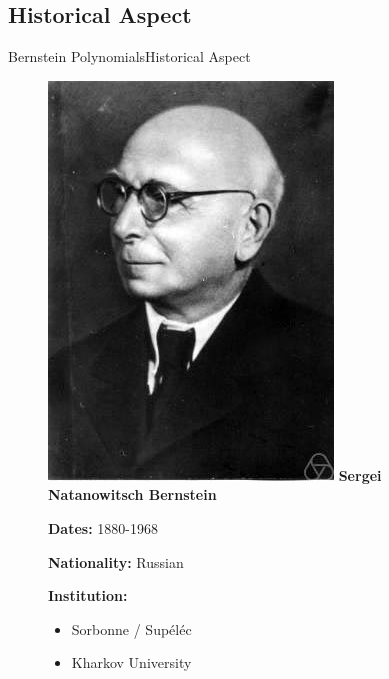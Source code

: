 \documentclass[10pt]{beamer}
\begin{document}
  \subsection{Historical Aspect}

\begin{frame}{Bernstein Polynomials}{Historical Aspect}
   \vspace{-0cm}
  \begin{figure}[H]
    \begin{minipage}[top]{0.30\linewidth}
      \centering
      \includegraphics[scale=0.25]{sergei.png}
      \textbf{Sergei Natanowitsch Bernstein \footnotemark[1]}
    \end{minipage}
    \hspace{-2cm}
    \begin{minipage}[top]{0.80\linewidth}


      \hspace{2cm}
      \textbf{Dates:} \hspace{0.94cm} 1880-1968


      \hspace{2cm}
      \textbf{Nationality:} \hspace{0.09cm} Russian
      
      \hspace{2cm}
      \textbf{Institution:}
      
      \hspace{1cm}
      \vspace{-0.95cm}
      \begin{itemize}
        \item[] \hspace{3.54cm} Sorbonne / Supéléc
        \item[]   \hspace{3.54cm} Kharkov University
          

\end{itemize}
\end{minipage}
\end{figure}
\end{frame}
\end{document}
